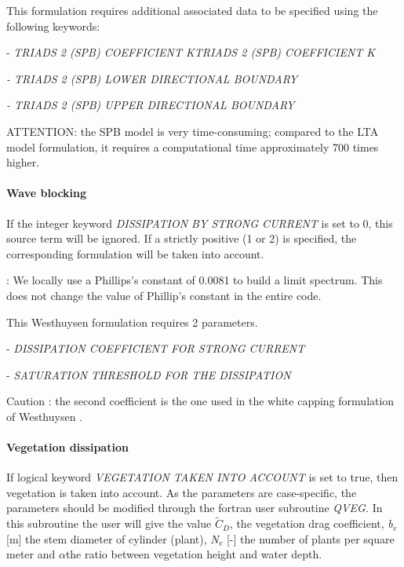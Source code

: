  \textbf{}

 This formulation requires additional associated data to be specified using the following keywords:

 - \textit{TRIADS 2 (SPB) COEFFICIENT KTRIADS 2 (SPB) COEFFICIENT K}

 \textit{- TRIADS 2 (SPB) LOWER DIRECTIONAL BOUNDARY}

 \textit{- TRIADS 2 (SPB) UPPER DIRECTIONAL BOUNDARY}

 ATTENTION: the SPB model is very time-consuming; compared to the LTA model formulation, it requires a computational time approximately 700 times higher.


\paragraph{ Wave blocking }

 If the integer keyword \textit{DISSIPATION BY STRONG CURRENT} is set to 0, this source term will be ignored. If a strictly positive (1 or 2) is specified, the corresponding formulation will be taken into account.

 \textbf{} : We locally use a Phillips's constant of 0.0081 to build a limit spectrum. This does not change the value of Phillip's constant in the entire code.  

 \textbf{}

 This Westhuysen formulation requires 2 parameters.

 - \textit{DISSIPATION COEFFICIENT FOR STRONG CURRENT}

 - \textit{SATURATION THRESHOLD FOR THE DISSIPATION}

 Caution : the second coefficient is the one used in the white capping formulation of Westhuysen \cite{Westhuys2008}.


\paragraph{ Vegetation dissipation}

 If logical keyword \textit{VEGETATION TAKEN INTO ACCOUNT} is set to true, then vegetation is taken into account. As the parameters are case-specific, the parameters should be modified through the fortran user subroutine \textit{QVEG. }In this subroutine the user will give the value $\tilde{C}_{D} $, the vegetation drag coefficient, \textit{b${}_{v}$} [m] the stem diameter of cylinder (plant), \textit{N${}_{v}$} [-] the number of plants per square meter and $\alpha $the ratio between vegetation height and water depth.

